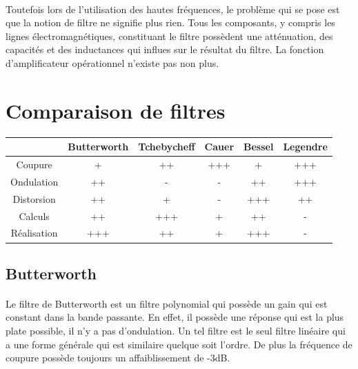 \documentclass[a4paper,11pt]{article}
\begin{document}
    \paragraph{}
Toutefois lors de l’utilisation des hautes fréquences, le problème qui se pose est que la notion de filtre ne signifie plus rien.
Tous les composants, y compris les lignes électromagnétiques, constituant le filtre possèdent une atténuation, des capacités et des inductances qui influes sur le résultat du filtre.
La fonction d’amplificateur opérationnel n’existe pas non plus.



\section{Comparaison de filtres}

    \begin{tabular}{|c|c|c|c|c|c|}
        \hline
                        & Butterworth   & Tchebycheff   & Cauer     & Bessel    & Legendre  \\
        \hline
            Coupure     & +             & ++            & +++       & +         & +++       \\
        \hline
            Ondulation  & ++            & -             & -         & ++        & +++       \\
        \hline
            Distorsion  & ++            & +             & -         & +++       & ++        \\
        \hline
            Calculs     & ++            & +++           & +         & ++        & -         \\
        \hline
            Réalisation & +++           & ++            & +         & +++       & -         \\
        \hline
    \end{tabular}

    \subsection{Butterworth}
        \paragraph{}
Le filtre de Butterworth est un filtre polynomial qui possède un gain qui est constant dans la bande passante.
En effet, il possède une réponse qui est la plus plate possible, il n’y a pas d’ondulation.
Un tel filtre est le seul filtre linéaire qui a une forme générale qui est similaire quelque soit l’ordre.
De plus la fréquence de coupure possède toujours un affaiblissement de -3dB.
\end{document}
